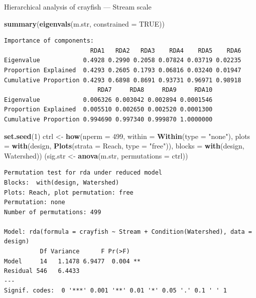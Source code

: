 \documentclass[10pt,ignorenonframetext,compress, aspectratio=169]{beamer}
\newenvironment{Shaded}{\begin{snugshade}}{\end{snugshade}}
\newcommand{\KeywordTok}[1]{\textcolor[rgb]{0.13,0.29,0.53}{\textbf{{#1}}}}
\newcommand{\DataTypeTok}[1]{\textcolor[rgb]{0.13,0.29,0.53}{{#1}}}
\newcommand{\DecValTok}[1]{\textcolor[rgb]{0.00,0.00,0.81}{{#1}}}
\newcommand{\StringTok}[1]{\textcolor[rgb]{0.31,0.60,0.02}{{#1}}}
\newcommand{\OtherTok}[1]{\textcolor[rgb]{0.56,0.35,0.01}{{#1}}}
\newcommand{\NormalTok}[1]{{#1}}
\begin{document}
\begin{frame}[fragile]{Hierarchical analysis of crayfish --- Stream
scale}

\tiny

\begin{Shaded}
\begin{Highlighting}[]
\KeywordTok{summary}\NormalTok{(}\KeywordTok{eigenvals}\NormalTok{(m.str, }\DataTypeTok{constrained =} \OtherTok{TRUE}\NormalTok{))}
\end{Highlighting}
\end{Shaded}

\begin{verbatim}
Importance of components:
                        RDA1   RDA2   RDA3    RDA4    RDA5    RDA6
Eigenvalue            0.4928 0.2990 0.2058 0.07824 0.03719 0.02235
Proportion Explained  0.4293 0.2605 0.1793 0.06816 0.03240 0.01947
Cumulative Proportion 0.4293 0.6898 0.8691 0.93731 0.96971 0.98918
                          RDA7     RDA8     RDA9     RDA10
Eigenvalue            0.006326 0.003042 0.002894 0.0001546
Proportion Explained  0.005510 0.002650 0.002520 0.0001300
Cumulative Proportion 0.994690 0.997340 0.999870 1.0000000
\end{verbatim}

\begin{Shaded}
\begin{Highlighting}[]
\KeywordTok{set.seed}\NormalTok{(}\DecValTok{1}\NormalTok{)}
\NormalTok{ctrl <-}\StringTok{ }\KeywordTok{how}\NormalTok{(}\DataTypeTok{nperm =} \DecValTok{499}\NormalTok{, }\DataTypeTok{within =} \KeywordTok{Within}\NormalTok{(}\DataTypeTok{type =} \StringTok{"none"}\NormalTok{),}
            \DataTypeTok{plots =} \KeywordTok{with}\NormalTok{(design, }\KeywordTok{Plots}\NormalTok{(}\DataTypeTok{strata =} \NormalTok{Reach, }\DataTypeTok{type =} \StringTok{"free"}\NormalTok{)),}
            \DataTypeTok{blocks =} \KeywordTok{with}\NormalTok{(design, Watershed))}
\NormalTok{(sig.str <-}\StringTok{ }\KeywordTok{anova}\NormalTok{(m.str, }\DataTypeTok{permutations =} \NormalTok{ctrl))}
\end{Highlighting}
\end{Shaded}

\begin{verbatim}
Permutation test for rda under reduced model
Blocks:  with(design, Watershed) 
Plots: Reach, plot permutation: free
Permutation: none
Number of permutations: 499

Model: rda(formula = crayfish ~ Stream + Condition(Watershed), data = design)
          Df Variance      F Pr(>F)   
Model     14   1.1478 6.9477  0.004 **
Residual 546   6.4433                 
---
Signif. codes:  0 '***' 0.001 '**' 0.01 '*' 0.05 '.' 0.1 ' ' 1
\end{verbatim}

\normalsize

\end{frame}
\end{document}

